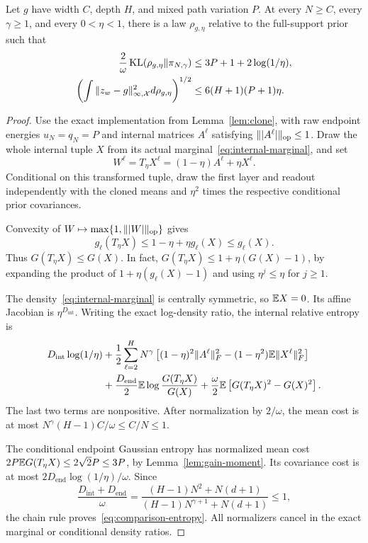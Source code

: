 \begin{lemma}
\label{lem:comparison}
Let $g$ have width $C$, depth $H$, and mixed path variation $P$. At every $N\ge C$, every $\gamma\ge1$, and every $0<\eta<1$, there is a law $\rho_{g,\eta}$ relative to the full-support prior such that
\begin{align}
 \frac2\omega\operatorname{KL}(\rho_{g,\eta}\|\pi_{N,\gamma})
 &\le3P+1+2\log(1/\eta),\label{eq:comparison-entropy}\\
 \left(\int\|z_w-g\|_{\infty,\mathcal X}^2d\rho_{g,\eta}\right)^{1/2}
 &\le6(H+1)(P+1)\eta.\label{eq:comparison-uniform}
\end{align}
\end{lemma}
\begin{proof}
Use the exact implementation from Lemma~\ref{lem:clone}, with raw endpoint energies $u_N=q_N=P$ and internal matrices $A^\ell$ satisfying $\||A^\ell|\|_{\mathrm{op}}\le1$. Draw the whole internal tuple $X$ from its actual marginal~\eqref{eq:internal-marginal}, and set
\[
 W^\ell=T_\eta X^\ell=(1-\eta)A^\ell+\eta X^\ell.
\]
Conditional on this transformed tuple, draw the first layer and readout independently with the cloned means and $\eta^2$ times the respective conditional prior covariances.

Convexity of $W\mapsto\max\{1,\||W|\|_{\mathrm{op}}\}$ gives
\[
 g_\ell(T_\eta X)\le1-\eta+\eta g_\ell(X)\le g_\ell(X).
\]
Thus $G(T_\eta X)\le G(X)$. In fact,
$G(T_\eta X)\le1+\eta(G(X)-1)$, by expanding the product of $1+\eta(g_\ell(X)-1)$ and using $\eta^j\le\eta$ for $j\ge1$.

The density~\eqref{eq:internal-marginal} is centrally symmetric, so $\mathbb E X=0$. Its affine Jacobian is $\eta^{D_{\mathrm{int}}}$. Writing the exact log-density ratio, the internal relative entropy is
\begin{align*}
 D_{\mathrm{int}}\log(1/\eta)
 &+\frac12\sum_{\ell=2}^HN^\gamma\left[(1-\eta)^2\|A^\ell\|_F^2
                      -(1-\eta^2)\mathbb E\|X^\ell\|_F^2\right]\\
 &+\frac{D_{\mathrm{end}}}{2}\mathbb E\log\frac{G(T_\eta X)}{G(X)}
  +\frac\omega2\mathbb E\left[G(T_\eta X)^2-G(X)^2\right].
\end{align*}
The last two terms are nonpositive. After normalization by $2/\omega$, the mean cost is at most
$N^\gamma(H-1)C/\omega\le C/N\le1$.

The conditional endpoint Gaussian entropy has normalized mean cost
$2P\mathbb E G(T_\eta X)\le2\sqrt2P\le3P$, by Lemma~\ref{lem:gain-moment}. Its covariance cost is at most $2D_{\mathrm{end}}\log(1/\eta)/\omega$. Since
\[
 \frac{D_{\mathrm{int}}+D_{\mathrm{end}}}{\omega}
 =\frac{(H-1)N^2+N(d+1)}{(H-1)N^{\gamma+1}+N(d+1)}\le1,
\]
the chain rule proves~\eqref{eq:comparison-entropy}. All normalizers cancel in the exact marginal or conditional density ratios.


\end{proof}
